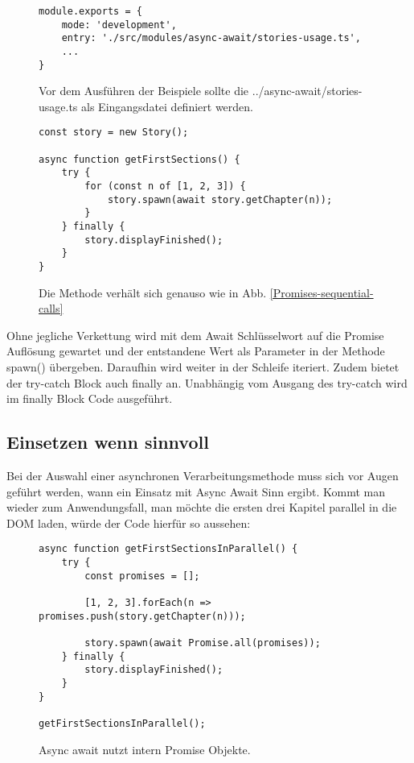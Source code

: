 \begin{figure}[H]
\begin{lstlisting}[basicstyle=\small]
module.exports = {
    mode: 'development',
    entry: './src/modules/async-await/stories-usage.ts',
    ...
}
\end{lstlisting}
\caption{Vor dem Ausführen der Beispiele sollte die ../async-await/stories-usage.ts als Eingangsdatei definiert werden.}
\end{figure}

\begin{figure}[H]
\begin{lstlisting}[basicstyle=\small]
const story = new Story();

async function getFirstSections() {
    try {
        for (const n of [1, 2, 3]) {
            story.spawn(await story.getChapter(n));
        }
    } finally {
        story.displayFinished();
    }
}
\end{lstlisting}
\caption{Die Methode verhält sich genauso wie in Abb. \ref{Promises-sequential-calls}}
\end{figure}

\noindent
Ohne jegliche Verkettung wird mit dem Await Schlüsselwort auf die Promise Auflösung gewartet und der entstandene Wert als Parameter in der Methode spawn() übergeben. Daraufhin wird weiter in der Schleife iteriert. Zudem bietet der try-catch Block auch finally an. Unabhängig vom Ausgang des try-catch wird im finally Block Code ausgeführt.

\subsection{Einsetzen wenn sinnvoll}

Bei der Auswahl einer asynchronen Verarbeitungsmethode muss sich vor Augen geführt werden, wann ein Einsatz mit Async Await Sinn ergibt. Kommt man wieder zum Anwendungsfall, man möchte die ersten drei Kapitel parallel in die DOM laden, würde der Code hierfür so aussehen:

\begin{figure}[H]
\begin{lstlisting}[basicstyle=\small]
async function getFirstSectionsInParallel() {
    try {
        const promises = [];

        [1, 2, 3].forEach(n => promises.push(story.getChapter(n)));

        story.spawn(await Promise.all(promises));
    } finally {
        story.displayFinished();
    }
}

getFirstSectionsInParallel();
\end{lstlisting}
\caption{Async await nutzt intern Promise Objekte.}
\end{figure}

